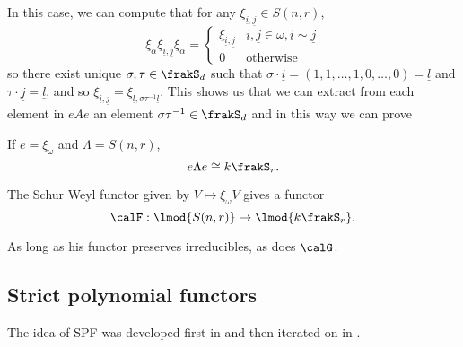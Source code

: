 \documentclass[12pt]{article}
\begin{document}
	In this case, we can compute that for any $\xi_{\underline i,\underline j}\in S(n,r)$,
	\[\xi_\alpha\xi_{\underline i,\underline j}\xi_\alpha=\begin{cases}
		\xi_{\underline i,\underline j}& \underline i,\underline j\in \omega,\underline i\sim \underline j\\
		0 & \text{otherwise}
	\end{cases}\]
	so there exist unique $\sigma,\tau\in\frakS_d$ such that $\sigma\cdot\underline i=(1,1,\dots,1,0,\dots,0)=\underline l$ and $\tau\cdot\underline j=\underline l$,
	and so $\xi_{\underline i,\underline j}=\xi_{\underline l,\sigma\tau^{-1}\underline l}$.
	This shows us that we can extract from each element in $eAe$ an element $\sigma\tau^{-1}\in\frakS_d$ and in this way 
	we can prove 
	\begin{lem}
		If $e=\xi_\omega$ and $\Lambda=S(n,r)$,
		\[e\Lambda e\cong k\frakS_r.\]
	\end{lem}
	\begin{cor}
		The Schur Weyl functor given by $V\mapsto \xi_\omega V$ gives a functor 
		\[\calF:\lmod{S(n,r)}\to \lmod{k\frakS_r}.\]
	\end{cor}
	\begin{rmk}
		As long as his functor preserves irreducibles, as does $\calG$.
	\end{rmk}

	\subsection{Strict polynomial functors}
	The idea of SPF was developed first in \cite{friedlander-suslin} and then iterated on in \cite{krause-strict-poly-func}.
\end{document}
